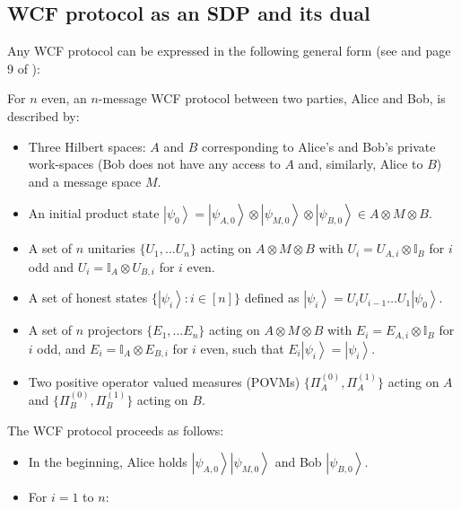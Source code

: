 \documentclass{article}
\begin{document}
\subsection{WCF protocol as an SDP and its dual\label{subsec:sdp}}
Any WCF protocol can be expressed
in the following general form (see
\cite{Ambainis04b} and page 9 of \cite{Mochon07}): %
%

\begin{definition}
  \label{def:WCFprotocol}For $n$ even, an $n$-message WCF protocol
  between two parties, Alice and Bob, is described by:
  \begin{itemize}
    \item Three Hilbert spaces: $A$ and $B$ corresponding
          to Alice's and Bob's private work-spaces (Bob does not have any access
          to $A$ and, similarly, Alice to $B$) and a message space
          $M$.
    \item An initial product state $\left|\psi_{0}\right\rangle =\left|\psi_{A,0}\right\rangle \otimes\left|\psi_{M,0}\right\rangle \otimes\left|\psi_{B,0}\right\rangle \in A\otimes M\otimes B$.
    \item A set of $n$ unitaries $\{U_{1},\dots U_{n}\}$ acting on $A\otimes M\otimes B$
          with $U_{i}=U_{A,i}\otimes\mathbb{I}_{B}$ for $i$ odd
          and $U_{i}=\mathbb{I}_{A}\otimes U_{B,i}$ for $i$ even.
    \item A set of honest states $\{\left|\psi_{i}\right\rangle :i\in[n]\}$
          defined as $\left|\psi_{i}\right\rangle =U_{i}U_{i-1}\dots U_{1}\left|\psi_{0}\right\rangle $.
    \item A set of $n$ projectors $\{E_{1},\dots E_{n}\}$ acting on $A\otimes M\otimes B$
          with $E_{i}=E_{A,i}\otimes\mathbb{I}_{B}$ for $i$ odd,
          and $E_{i}=\mathbb{I}_{A}\otimes E_{B,i}$ for $i$ even,
          such that $E_{i}\left|\psi_{i}\right\rangle =\left|\psi_{i}\right\rangle $.
    \item Two positive operator valued measures (POVMs) $\{\Pi_{A}^{(0)},\Pi_{A}^{(1)}\}$
          acting on $A$ and $\{\Pi_{B}^{(0)},\Pi_{B}^{(1)}\}$ acting
          on $B$.
  \end{itemize}
  The WCF protocol proceeds as follows:
  \begin{itemize}
    \item In the beginning, Alice holds $\left|\psi_{A,0}\right\rangle \left|\psi_{M,0}\right\rangle $
          and Bob $\left|\psi_{B,0}\right\rangle $.
    \item For $i=1$ to $n$:

\end{itemize}
\end{definition}
\end{document}
